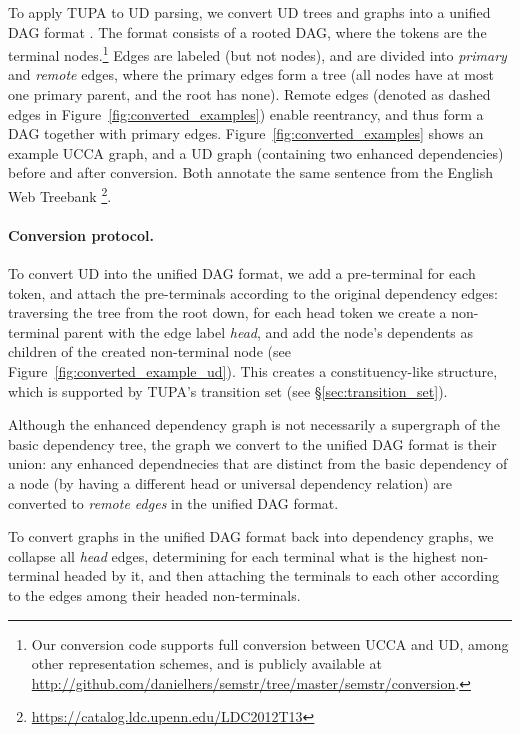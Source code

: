 \documentclass[11pt,a4paper]{article}
\begin{document}
To apply TUPA to UD parsing,
we convert UD trees and graphs into a unified DAG format \cite{hershcovich2018multitask}.
The format consists of a rooted DAG, where the tokens are the terminal
nodes.\footnote{Our conversion code supports full conversion between UCCA and UD,
among other representation schemes,
and is publicly available at \url{http://github.com/danielhers/semstr/tree/master/semstr/conversion}.}
Edges are labeled (but not nodes),
and are divided into \textit{primary} and \textit{remote} edges,
where the primary edges form a tree (all nodes have at most one primary parent,
and the root has none).
Remote edges (denoted as dashed edges in Figure~\ref{fig:converted_examples})
enable reentrancy, and thus form a DAG together with primary edges.
Figure~\ref{fig:converted_examples} shows an example UCCA graph,
and a UD graph (containing two enhanced dependencies) before and after conversion.
Both annotate the same sentence from the
English Web Treebank \cite{L14-1067}\footnote{\url{https://catalog.ldc.upenn.edu/LDC2012T13}}.

\paragraph{Conversion protocol.}

To convert UD into the unified DAG format,
we add a pre-terminal for each token,
and attach the pre-terminals according to the original dependency edges:
traversing the tree from the root down, for each head token we create a non-terminal
parent with the edge label {\it head},
and add the node's dependents as children of the created non-terminal node
(see Figure~\ref{fig:converted_example_ud}).
This creates a constituency-like structure,
which is supported by TUPA's transition set (see \S\ref{sec:transition_set}).

Although the enhanced dependency graph is not necessarily a supergraph
of the basic dependency tree,
the graph we convert to the unified DAG format is their union:
any enhanced dependnecies that are distinct from the basic dependency of a
node (by having a different head or universal dependency relation)
are converted to \textit{remote edges} in the unified DAG format.

To convert graphs in the unified DAG format back into dependency graphs,
we collapse all \textit{head} edges,
determining for each terminal what is the highest non-terminal headed by it,
and then attaching the terminals to each other according to the edges among
their headed non-terminals.
\end{document}
